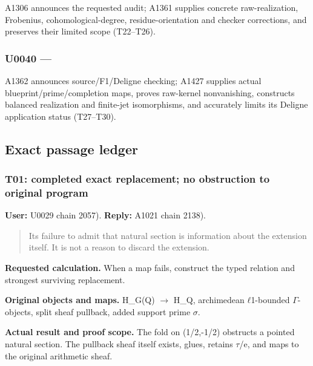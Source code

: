 A1306 announces the requested audit; A1361 supplies concrete
raw-realization, Frobenius, cohomological-degree, residue-orientation
and checker corrections, and preserves their limited scope (T22--T26).

\subsubsection{\texorpdfstring{U0040 ---
\protect{}}{U0040 --- }}\label{TranscriptLedgerStage:u0040-a10456e9-7f72-4c81-bc00-118fcd575269}

A1362 announces source/F1/Deligne checking; A1427 supplies actual
blueprint/prime/completion maps, proves raw-kernel nonvanishing,
constructs balanced realization and finite-jet isomorphisms, and
accurately limits its Deligne application status (T27--T30).

\subsection{Exact passage ledger}\label{TranscriptLedgerStage:exact-passage-ledger}

\subsubsection{T01: completed exact replacement; no obstruction to
original
program}\label{TranscriptLedgerStage:t01-completed-exact-replacement-no-obstruction-to-original-program}

\textbf{User:} U0029
\protect{} chain 2057).
\textbf{Reply:} A1021
\protect{} chain 2138).

\begin{quote}
Its failure to admit that natural section is information about the
extension itself. It is not a reason to discard the extension.
\end{quote}

\textbf{Requested calculation.} When a map fails, construct the typed
relation and strongest surviving replacement.

\textbf{Original objects and maps.} H\_G(Q)
\allowbreak{}\ensuremath{→}\allowbreak{} H\_Q, archimedean
\allowbreak{}\ensuremath{ℓ}\allowbreak{}1-bounded
\allowbreak{}\ensuremath{Γ}\allowbreak{}-objects, split sheaf pullback,
added support prime \allowbreak{}\ensuremath{σ}\allowbreak{}.

\textbf{Actual result and proof scope.} The fold on (1/2,-1/2) obstructs
a pointed natural section. The pullback sheaf itself exists, glues,
retains \allowbreak{}\ensuremath{τ}\allowbreak{}/e, and maps to the
original arithmetic sheaf.

